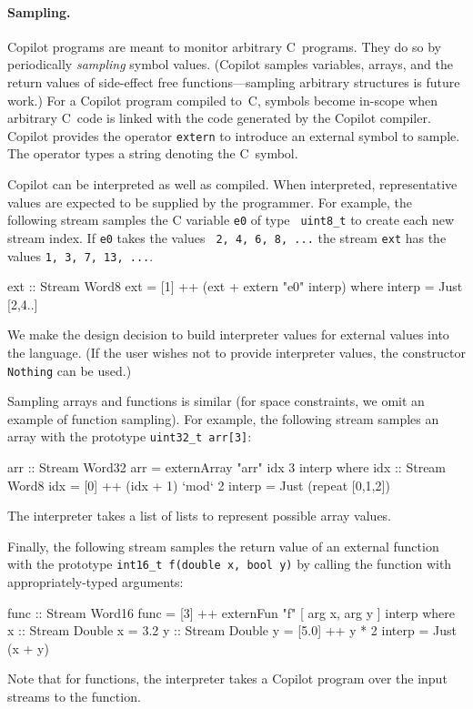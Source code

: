 \paragraph{Sampling.}
Copilot programs are meant to monitor arbitrary C~programs.  They do
so by
periodically \emph{sampling} symbol values. (Copilot samples variables, arrays,
and the return values of side-effect free functions---sampling arbitrary
structures is future work.)  For a Copilot program compiled to~C, symbols become
in-scope when arbitrary C~code is linked with the code generated by the Copilot
compiler.  Copilot provides the operator {\tt extern} to introduce an external
symbol to sample.  The operator types a string denoting the C~symbol.

Copilot can be interpreted as well as compiled.  When interpreted,
representative values are expected to be supplied by the programmer.  For
example, the following stream samples the C variable {\tt e0} of type {\tt
  uint8\_t} to create each new stream index.  If {\tt e0} takes the values {\tt
  2, 4, 6, 8, ...}  the stream {\tt ext} has the values {\tt 1, 3, 7, 13, ...}.
%
\begin{code}
ext :: Stream Word8
ext = [1] ++ (ext + extern "e0" interp)
  where interp = Just [2,4..]
\end{code}
%
We make the design decision to build interpreter values for external values
into the language.  (If the user wishes not to provide interpreter values,
the constructor {\tt Nothing} can be used.)

Sampling arrays and functions is similar (for space constraints, we omit an
example of function sampling).  For example, the following stream samples an
array with the prototype {\tt uint32\_t arr[3]}:
%
\begin{code}
arr :: Stream Word32
arr = externArray "arr" idx 3 interp
  where idx :: Stream Word8
        idx    = [0] ++ (idx + 1) `mod` 2
        interp = Just (repeat [0,1,2])
\end{code}
The interpreter takes a list of lists to represent possible array values.

Finally, the following stream samples the return value of an external function
with the prototype {\tt int16\_t f(double x, bool y)} by calling the function
with appropriately-typed arguments:
%
\begin{code}
func :: Stream Word16
func = [3] ++ externFun "f" [ arg x, arg y ] interp
  where x :: Stream Double
        x = 3.2
        y :: Stream Double
        y = [5.0] ++ y * 2
        interp = Just (x + y)
\end{code}
%
Note that for functions, the interpreter takes a Copilot program over the input
streams to the function.


